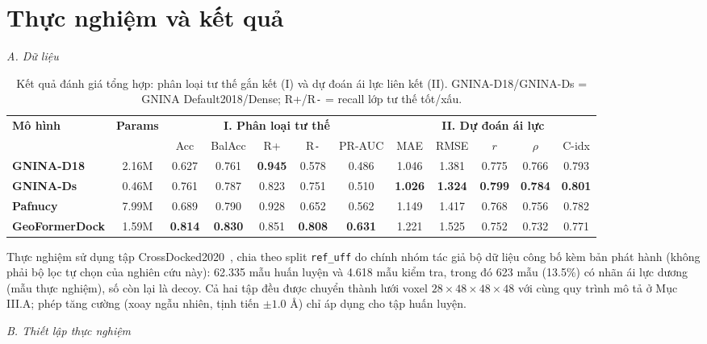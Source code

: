 \section{Thực nghiệm và kết quả}

\textit{A. Dữ liệu}

\begin{table}[t]
\centering
\caption{Kết quả đánh giá tổng hợp: phân loại tư thế gắn kết (I) và dự đoán ái lực liên kết (II). GNINA-D18/GNINA-Ds = GNINA Default2018/Dense; R+/R\texttt{-} = recall lớp tư thế tốt/xấu.}
\label{tab:combined_results}
\footnotesize
\begin{tabular}{lc ccccc ccccc}
\hline
\multirow{2}{*}{\textbf{Mô hình}} & \multirow{2}{*}{\textbf{Params}} & \multicolumn{5}{c}{\textbf{I. Phân loại tư thế}} & \multicolumn{5}{c}{\textbf{II. Dự đoán ái lực}} \\
\cmidrule(lr){3-7} \cmidrule(lr){8-12}
 & & Acc & BalAcc & R+ & R\texttt{-} & PR-AUC & MAE & RMSE & $r$ & $\rho$ & C-idx \\
\hline
\textbf{GNINA-D18}     & 2.16M & 0.627 & 0.761 & \textbf{0.945} & 0.578 & 0.486 & 1.046 & 1.381 & 0.775 & 0.766 & 0.793 \\
\textbf{GNINA-Ds}      & 0.46M & 0.761 & 0.787 & 0.823          & 0.751 & 0.510 & \textbf{1.026} & \textbf{1.324} & \textbf{0.799} & \textbf{0.784} & \textbf{0.801} \\
\textbf{Pafnucy}       & 7.99M & 0.689 & 0.790 & 0.928          & 0.652 & 0.562 & 1.149 & 1.417 & 0.768 & 0.756 & 0.782 \\
\textbf{GeoFormerDock} & 1.59M & \textbf{0.814} & \textbf{0.830} & 0.851 & \textbf{0.808} & \textbf{0.631} & 1.221 & 1.525 & 0.752 & 0.732 & 0.771 \\
\hline
\end{tabular}
\end{table}

Thực nghiệm sử dụng tập CrossDocked2020~\cite{francoeur2020three}, chia theo split \texttt{ref\_uff} do chính nhóm tác giả bộ dữ liệu công bố kèm bản phát hành (không phải bộ lọc tự chọn của nghiên cứu này): 62.335 mẫu huấn luyện và 4.618 mẫu kiểm tra, trong đó 623 mẫu (13.5\%) có nhãn ái lực dương (mẫu thực nghiệm), số còn lại là decoy. Cả hai tập đều được chuyển thành lưới voxel $28 \times 48 \times 48 \times 48$ với cùng quy trình mô tả ở Mục III.A; phép tăng cường (xoay ngẫu nhiên, tịnh tiến $\pm 1.0$ \AA) chỉ áp dụng cho tập huấn luyện.

\textit{B. Thiết lập thực nghiệm}

